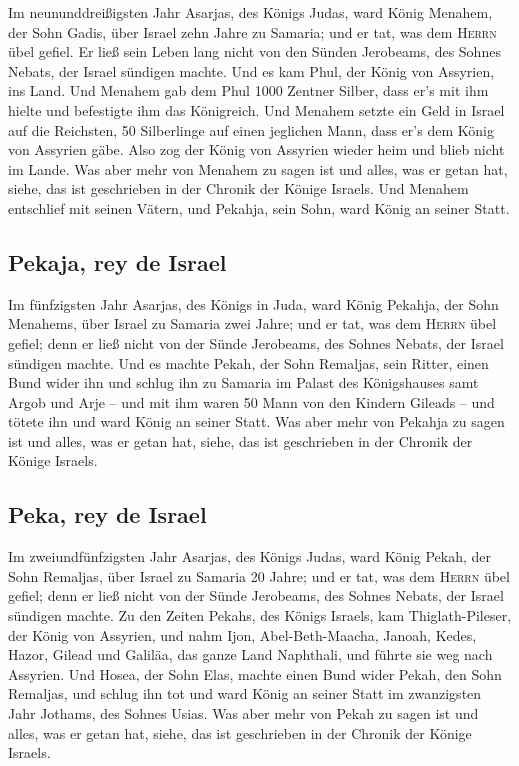  Im neununddreißigsten Jahr Asarjas, des Königs Judas,
ward König Menahem, der Sohn Gadis, über Israel zehn Jahre zu Samaria;
 und er tat, was dem \textsc{Herrn} übel gefiel. Er ließ
sein Leben lang nicht von den Sünden Jerobeams, des Sohnes Nebats, der
Israel sündigen machte.  Und es kam Phul, der König von
Assyrien, ins Land. Und Menahem gab dem Phul 1000 Zentner Silber, dass
er's mit ihm hielte und befestigte ihm das Königreich. 
Und Menahem setzte ein Geld in Israel auf die Reichsten, 50 Silberlinge
auf einen jeglichen Mann, dass er's dem König von Assyrien gäbe. Also
zog der König von Assyrien wieder heim und blieb nicht im Lande.
 Was aber mehr von Menahem zu sagen ist und alles, was er
getan hat, siehe, das ist geschrieben in der Chronik der Könige Israels.
 Und Menahem entschlief mit seinen Vätern, und Pekahja,
sein Sohn, ward König an seiner Statt.

\hypertarget{pekaja-rey-de-israel}{%
\subsection{Pekaja, rey de Israel}\label{pekaja-rey-de-israel}}

 Im fünfzigsten Jahr Asarjas, des Königs in Juda, ward
König Pekahja, der Sohn Menahems, über Israel zu Samaria zwei Jahre;
 und er tat, was dem \textsc{Herrn} übel gefiel; denn er
ließ nicht von der Sünde Jerobeams, des Sohnes Nebats, der Israel
sündigen machte.  Und es machte Pekah, der Sohn Remaljas,
sein Ritter, einen Bund wider ihn und schlug ihn zu Samaria im Palast
des Königshauses samt Argob und Arje -- und mit ihm waren 50 Mann von
den Kindern Gileads -- und tötete ihn und ward König an seiner Statt.
 Was aber mehr von Pekahja zu sagen ist und alles, was er
getan hat, siehe, das ist geschrieben in der Chronik der Könige Israels.

\hypertarget{peka-rey-de-israel}{%
\subsection{Peka, rey de Israel}\label{peka-rey-de-israel}}

 Im zweiundfünfzigsten Jahr Asarjas, des Königs Judas,
ward König Pekah, der Sohn Remaljas, über Israel zu Samaria 20 Jahre;
 und er tat, was dem \textsc{Herrn} übel gefiel; denn er
ließ nicht von der Sünde Jerobeams, des Sohnes Nebats, der Israel
sündigen machte.  Zu den Zeiten Pekahs, des Königs
Israels, kam Thiglath-Pileser, der König von Assyrien, und nahm Ijon,
Abel-Beth-Maacha, Janoah, Kedes, Hazor, Gilead und Galiläa, das ganze
Land Naphthali, und führte sie weg nach Assyrien.  Und
Hosea, der Sohn Elas, machte einen Bund wider Pekah, den Sohn Remaljas,
und schlug ihn tot und ward König an seiner Statt im zwanzigsten Jahr
Jothams, des Sohnes Usias.  Was aber mehr von Pekah zu
sagen ist und alles, was er getan hat, siehe, das ist geschrieben in der
Chronik der Könige Israels.

